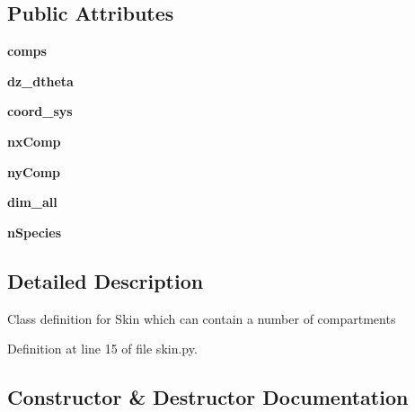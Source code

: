 \subsection*{Public Attributes}
\begin{DoxyCompactItemize}
\item 
{\bfseries comps}\hypertarget{classskin_1_1Skin_ac0a2c5b23d7f0f6e69edb6f666c6a8fc}{}\label{classskin_1_1Skin_ac0a2c5b23d7f0f6e69edb6f666c6a8fc}

\item 
{\bfseries dz\+\_\+dtheta}\hypertarget{classskin_1_1Skin_a98d8567140984e95305662589e657547}{}\label{classskin_1_1Skin_a98d8567140984e95305662589e657547}

\item 
{\bfseries coord\+\_\+sys}\hypertarget{classskin_1_1Skin_aad2b880a94cc302d53283788e8954073}{}\label{classskin_1_1Skin_aad2b880a94cc302d53283788e8954073}

\item 
{\bfseries nx\+Comp}\hypertarget{classskin_1_1Skin_aee39d4b54e8b6455c19ebe1f7f4c80f4}{}\label{classskin_1_1Skin_aee39d4b54e8b6455c19ebe1f7f4c80f4}

\item 
{\bfseries ny\+Comp}\hypertarget{classskin_1_1Skin_a6aa1a281abb786a7c7590207638dc44c}{}\label{classskin_1_1Skin_a6aa1a281abb786a7c7590207638dc44c}

\item 
{\bfseries dim\+\_\+all}\hypertarget{classskin_1_1Skin_a22c2a2306ddd7c388c1eb1e16ce644b5}{}\label{classskin_1_1Skin_a22c2a2306ddd7c388c1eb1e16ce644b5}

\item 
{\bfseries n\+Species}\hypertarget{classskin_1_1Skin_a68591f41f7298b9df879ab849d324f3d}{}\label{classskin_1_1Skin_a68591f41f7298b9df879ab849d324f3d}

\end{DoxyCompactItemize}


\subsection{Detailed Description}
\begin{DoxyVerb}Class definition for Skin
which can contain a number of compartments
\end{DoxyVerb}
 

Definition at line 15 of file skin.\+py.



\subsection{Constructor \& Destructor Documentation}
